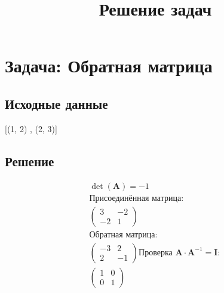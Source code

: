 \documentclass{article}
\begin{document}
\title{Решение задач}
\maketitle
\section{Задача: Обратная матрица}
\subsection{Исходные данные}
[(1, 2) ,  (2, 3)]
\subsection{Решение}
\begin{align*}
\det(\mathbf{A}) = -1\\
\text{Присоединённая матрица:}\\
\begin{pmatrix}
3 & -2 \\
-2 & 1\end{pmatrix}
\\
\text{Обратная матрица:}\\
\begin{pmatrix}
-3 & 2 \\
2 & -1\end{pmatrix}

\text{Проверка } \mathbf{A} \cdot \mathbf{A}^{-1} = \mathbf{I}:\\
\begin{pmatrix}
1 & 0 \\
0 & 1\end{pmatrix}

\end{align*}
\end{document}
